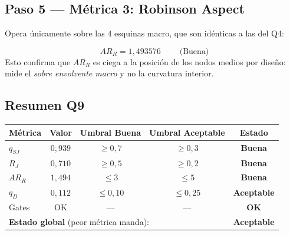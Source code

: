 \documentclass[11pt,a4paper]{article}
\begin{document}
\subsection{Paso 5 --- M\'etrica 3: Robinson Aspect}
Opera \'unicamente sobre las 4 esquinas macro, que son id\'enticas a las del Q4:

\begin{resultbox}[title={M\'etrica 3: Robinson Aspect Q9 (identico al Q4)}]
\[
\boxed{\;AR_R = 1{,}493576\;} \qquad \text{(Buena)}
\]
Esto confirma que $AR_R$ es ciega a la posici\'on de los nodos medios por dise\~no: mide el \emph{sobre envolvente macro} y no la curvatura interior.
\end{resultbox}

\subsection{Resumen Q9}
\begin{center}
\renewcommand{\arraystretch}{1.2}
\begin{tabular}{lcccc}
\toprule
M\'etrica & Valor & Umbral Buena & Umbral Aceptable & Estado \\
\midrule
$q_{SJ}$  & $0{,}939$ & $\ge 0{,}7$ & $\ge 0{,}3$ & \textcolor{good}{\textbf{Buena}} \\
$R_J$     & $0{,}710$ & $\ge 0{,}5$ & $\ge 0{,}2$ & \textcolor{good}{\textbf{Buena}} \\
$AR_R$    & $1{,}494$ & $\le 3$     & $\le 5$     & \textcolor{good}{\textbf{Buena}} \\
$q_D$     & $0{,}112$ & $\le 0{,}10$ & $\le 0{,}25$ & \textcolor{warn}{\textbf{Aceptable}} \\
Gates     & OK        & ---         & ---         & \textcolor{good}{\textbf{OK}} \\
\midrule
\multicolumn{4}{l}{\textbf{Estado global} (peor m\'etrica manda):} & \textcolor{warn}{\textbf{Aceptable}} \\
\bottomrule
\end{tabular}
\end{center}
\end{document}
